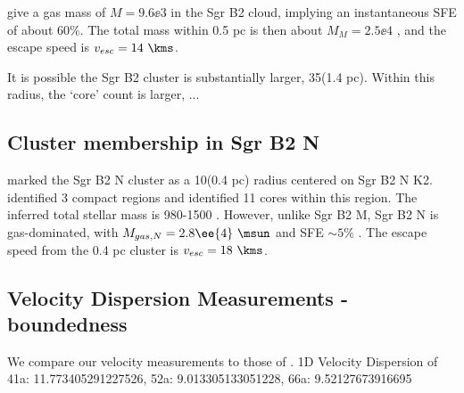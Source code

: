 \citet{Schmiedeke2016a} give a gas mass of $M=9.6\ee{3}$ \msun in the Sgr B2
cloud, implying an instantaneous SFE of about 60\%.  The total mass within 0.5
pc is then about $M_M = 2.5\ee{4}$ \msun, and the escape speed is
$v_{esc}=14~\kms$.



It is possible the Sgr B2 cluster is substantially larger, 35\arcsec (1.4 pc).
Within this radius, the `core' count is larger, ...

\subsection{Cluster membership in Sgr B2 N}
\citet{Schmiedeke2016a} marked the Sgr B2 N cluster as a 10\arcsec  (0.4 pc) radius
centered on Sgr B2 N K2.  \citet{Schmiedeke2016a} identified 3 compact \hii regions
and \citet{Ginsburg2017c} identified 11 cores within this region.  The inferred
total stellar mass is 980-1500 \msun.  However, unlike Sgr B2 M, Sgr B2 N
is gas-dominated, with $M_{gas,N} = 2.8\ee{4}~\msun$ and SFE $\sim5\%$ \citep{Schmiedeke2016a}.
The escape speed from the 0.4 pc cluster is $v_{esc} = 18~\kms$.


\subsection{Velocity Dispersion Measurements - boundedness}

We compare our velocity measurements to those of \citet{De-Pree2011a}.
1D Velocity Dispersion of 41a: 11.773405291227526, 52a: 9.013305133051228, 66a: 9.52127673916695
